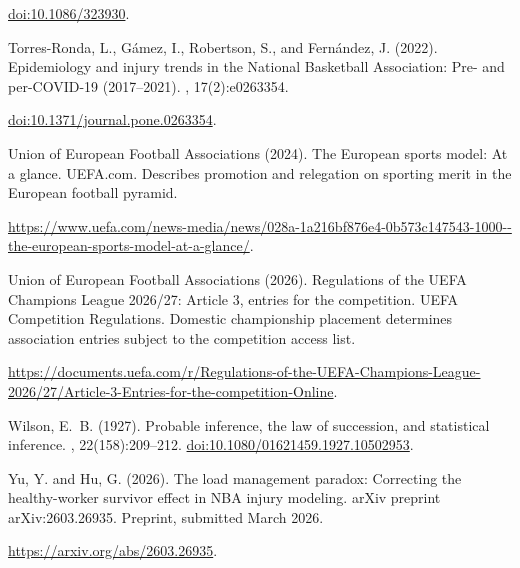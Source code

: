\documentclass[11pt]{article}
\begin{document}
\begin{thebibliography}{}
\newblock \href{https://doi.org/10.1086/323930}{doi:10.1086/323930}.\par
{}
Torres-Ronda, L., G{\'a}mez, I., Robertson, S., and Fern{\'a}ndez, J. (2022).
\newblock Epidemiology and injury trends in the National Basketball
  Association: Pre- and per-{COVID-19} (2017--2021).
, 17(2):e0263354.

\newblock \href{https://doi.org/10.1371/journal.pone.0263354}{doi:10.1371/journal.pone.0263354}.\par
{}
{Union of European Football Associations} (2024).
\newblock The European sports model: At a glance.
\newblock UEFA.com.
\newblock Describes promotion and relegation on sporting merit in the European
  football pyramid.

\newblock \url{https://www.uefa.com/news-media/news/028a-1a216bf876e4-0b573c147543-1000--the-european-sports-model-at-a-glance/}.\par
{}
{Union of European Football Associations} (2026).
\newblock Regulations of the UEFA Champions League 2026/27: Article 3, entries
  for the competition.
\newblock UEFA Competition Regulations.
\newblock Domestic championship placement determines association entries
  subject to the competition access list.

\newblock \url{https://documents.uefa.com/r/Regulations-of-the-UEFA-Champions-League-2026/27/Article-3-Entries-for-the-competition-Online}.\par
{}
Wilson, E.~B. (1927).
\newblock Probable inference, the law of succession, and statistical inference.
, 22(158):209--212.
\newblock \href{https://doi.org/10.1080/01621459.1927.10502953}{doi:10.1080/01621459.1927.10502953}.\par

Yu, Y. and Hu, G. (2026).
\newblock The load management paradox: Correcting the healthy-worker survivor
  effect in {NBA} injury modeling.
\newblock arXiv preprint arXiv:2603.26935.
\newblock Preprint, submitted March 2026.

\newblock \url{https://arxiv.org/abs/2603.26935}.\par
\end{thebibliography}
\end{document}
